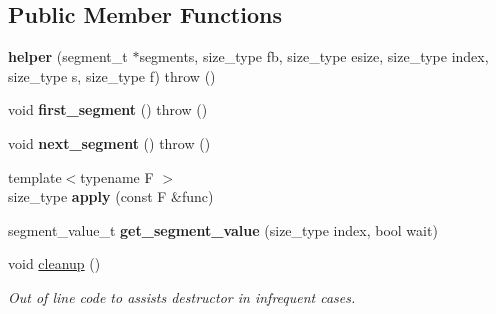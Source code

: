 \subsection*{Public Member Functions}
\begin{DoxyCompactItemize}
\item 
\hypertarget{classtbb_1_1internal_1_1concurrent__vector__base__v3_1_1helper_a1d27a17f878241689d578c39dbc60e52}{}{\bfseries helper} (segment\+\_\+t $\ast$segments, size\+\_\+type fb, size\+\_\+type esize, size\+\_\+type index, size\+\_\+type s, size\+\_\+type f)  throw ()\label{classtbb_1_1internal_1_1concurrent__vector__base__v3_1_1helper_a1d27a17f878241689d578c39dbc60e52}

\item 
\hypertarget{classtbb_1_1internal_1_1concurrent__vector__base__v3_1_1helper_ae2d37e907eaf946201ffabab9933e9e8}{}void {\bfseries first\+\_\+segment} ()  throw ()\label{classtbb_1_1internal_1_1concurrent__vector__base__v3_1_1helper_ae2d37e907eaf946201ffabab9933e9e8}

\item 
\hypertarget{classtbb_1_1internal_1_1concurrent__vector__base__v3_1_1helper_aa063e0585da75011b5da50814190bc73}{}void {\bfseries next\+\_\+segment} ()  throw ()\label{classtbb_1_1internal_1_1concurrent__vector__base__v3_1_1helper_aa063e0585da75011b5da50814190bc73}

\item 
\hypertarget{classtbb_1_1internal_1_1concurrent__vector__base__v3_1_1helper_a8b58384ccecbc58008a80cd16ad7e92c}{}{\footnotesize template$<$typename F $>$ }\\size\+\_\+type {\bfseries apply} (const F \&func)\label{classtbb_1_1internal_1_1concurrent__vector__base__v3_1_1helper_a8b58384ccecbc58008a80cd16ad7e92c}

\item 
\hypertarget{classtbb_1_1internal_1_1concurrent__vector__base__v3_1_1helper_af83f8e2f96bd0d59afca03d43aa4cf74}{}segment\+\_\+value\+\_\+t {\bfseries get\+\_\+segment\+\_\+value} (size\+\_\+type index, bool wait)\label{classtbb_1_1internal_1_1concurrent__vector__base__v3_1_1helper_af83f8e2f96bd0d59afca03d43aa4cf74}

\item 
\hypertarget{classtbb_1_1internal_1_1concurrent__vector__base__v3_1_1helper_a0fe7c70323f24d5d3ef9fa6912104bf3}{}void \hyperlink{classtbb_1_1internal_1_1concurrent__vector__base__v3_1_1helper_a0fe7c70323f24d5d3ef9fa6912104bf3}{cleanup} ()\label{classtbb_1_1internal_1_1concurrent__vector__base__v3_1_1helper_a0fe7c70323f24d5d3ef9fa6912104bf3}

\begin{DoxyCompactList}\small\item\em Out of line code to assists destructor in infrequent cases. \end{DoxyCompactList}\end{DoxyCompactItemize}
